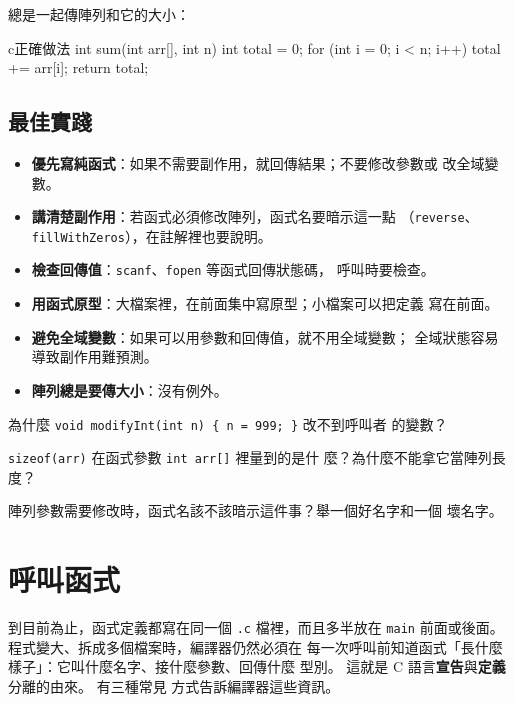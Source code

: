 總是一起傳陣列和它的大小：

\begin{code}{c}{正確做法}
int sum(int arr[], int n) {
    int total = 0;
    for (int i = 0; i < n; i++) {
        total += arr[i];
    }
    return total;
}
\end{code}

\subsection{最佳實踐}

\begin{itemize}
\item \textbf{優先寫純函式}：如果不需要副作用，就回傳結果；不要修改參數或
改全域變數。

\item \textbf{講清楚副作用}：若函式必須修改陣列，函式名要暗示這一點
（\texttt{reverse}、\texttt{fillWithZeros}），在註解裡也要說明。

\item \textbf{檢查回傳值}：\texttt{scanf}、\texttt{fopen} 等函式回傳狀態碼，
呼叫時要檢查。

\item \textbf{用函式原型}：大檔案裡，在前面集中寫原型；小檔案可以把定義
寫在前面。

\item \textbf{避免全域變數}：如果可以用參數和回傳值，就不用全域變數；
全域狀態容易導致副作用難預測。

\item \textbf{陣列總是要傳大小}：沒有例外。
\end{itemize}

\begin{drills}[label=drills:func-pitfalls]
\item 為什麼 \texttt{void modifyInt(int n) \{ n = 999; \}} 改不到呼叫者
的變數？
\item \texttt{sizeof(arr)} 在函式參數 \texttt{int arr[]} 裡量到的是什
麼？為什麼不能拿它當陣列長度？
\item 陣列參數需要修改時，函式名該不該暗示這件事？舉一個好名字和一個
壞名字。
\end{drills}

\section{呼叫函式}
\label{sec:func-declare}

到目前為止，函式定義都寫在同一個 \texttt{.c} 檔裡，而且多半放在
\texttt{main} 前面或後面。 程式變大、拆成多個檔案時，編譯器仍然必須在
每一次呼叫前知道函式「長什麼樣子」：它叫什麼名字、接什麼參數、回傳什麼
型別。 這就是 C 語言\textbf{宣告}與\textbf{定義}分離的由來。 有三種常見
方式告訴編譯器這些資訊。

